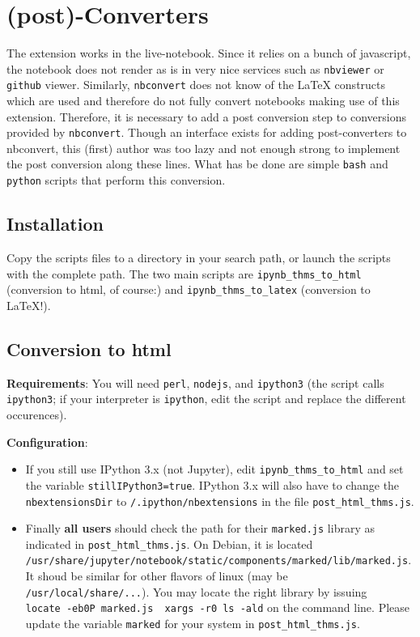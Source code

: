     \section{(post)-Converters}\label{post-converters}

    The extension works in the live-notebook. Since it relies on a bunch of
javascript, the notebook does not render as is in very nice services
such as \texttt{nbviewer} or \texttt{github} viewer. Similarly,
\texttt{nbconvert} does not know of the LaTeX constructs which are used
and therefore do not fully convert notebooks making use of this
extension. Therefore, it is necessary to add a post conversion step to
conversions provided by \texttt{nbconvert}. Though an interface exists
for adding post-converters to nbconvert, this (first) author was too
lazy and not enough strong to implement the post conversion along these
lines. What has be done are simple \texttt{bash} and \texttt{python}
scripts that perform this conversion.

    \subsection{Installation}\label{installation}

    Copy the scripts files to a directory in your search path, or launch the
scripts with the complete path. The two main scripts are
\texttt{ipynb\_thms\_to\_html} (conversion to html, of course:) and
\texttt{ipynb\_thms\_to\_latex} (conversion to LaTeX!).

    \subsection{Conversion to html}\label{conversion-to-html}

    \textbf{Requirements}: You will need \texttt{perl}, \texttt{nodejs}, and
\texttt{ipython3} (the script calls \texttt{ipython3}; if your
interpreter is \texttt{ipython}, edit the script and replace the
different occurences).

\textbf{Configuration}:

\begin{itemize}
\itemsep1pt\parskip0pt \item If you still use IPython 3.x (not
Jupyter), edit \texttt{ipynb\_thms\_to\_html} and set the variable
\texttt{stillIPython3=true}. IPython 3.x will also have to change the
\texttt{nbextensionsDir} to \texttt{/.ipython/nbextensions} in the file
\texttt{post\_html\_thms.js}. \item Finally \textbf{all users} should
check the path for their \texttt{marked.js} library as indicated in
\texttt{post\_html\_thms.js}. On Debian, it is located
\texttt{/usr/share/jupyter/notebook/static/components/marked/lib/marked.js}.
It shoud be similar for other flavors of linux (may be
\texttt{/usr/local/share/...}). You may locate the right library by
issuing
\texttt{locate\ -eb0P\ marked.js\ \textbar{}\ xargs\ -r0\ ls\ -ald} on
the command line. Please update the variable \texttt{marked} for your
system in \texttt{post\_html\_thms.js}.
\end{itemize}

